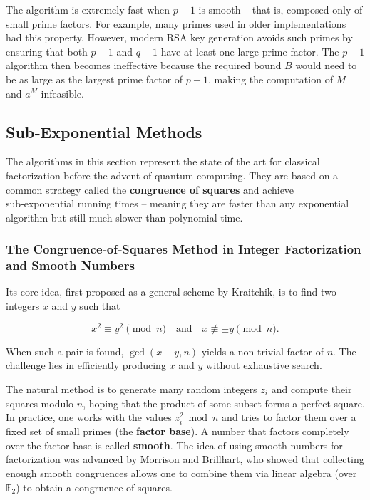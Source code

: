 The algorithm is extremely fast when \(p-1\) is smooth – that is, composed only of small prime factors. For example, many primes used in older implementations had this property. However, modern RSA key generation avoids such primes by ensuring that both \(p-1\) and \(q-1\) have at least one large prime factor. The \(p-1\) algorithm then becomes ineffective because the required bound \(B\) would need to be as large as the largest prime factor of \(p-1\), making the computation of \(M\) and \(a^M\) infeasible.

\subsection{Sub‑Exponential  Methods}

The algorithms in this section represent the state of the art for classical factorization before the advent of quantum computing. They are based on a common strategy called the \textbf{congruence of squares} and achieve sub‑exponential running times – meaning they are faster than any exponential algorithm but still much slower than polynomial time.

\subsubsection*{The Congruence‑of‑Squares Method in Integer Factorization and Smooth Numbers}

Its core idea, first proposed as a general scheme by Kraitchik, is to find two integers \(x\) and \(y\) such that

\[
x^2 \equiv y^2 \pmod{n} \quad \text{and} \quad x \not\equiv \pm y \pmod{n}.
\]

When such a pair is found, \(\gcd(x-y, n)\) yields a non‑trivial factor of \(n\). The challenge lies in efficiently producing \(x\) and \(y\) without exhaustive search.

The natural method is to generate many random integers \(z_i\) and compute their squares modulo \(n\), hoping that the product of some subset forms a perfect square. In practice, one works with the values \(z_i^2 \bmod n\) and tries to factor them over a fixed set of small primes (the \textbf{factor base}). A number that factors completely over the factor base is called \textbf{smooth}. The idea of using smooth numbers for factorization was advanced by Morrison and Brillhart, who showed that collecting enough smooth congruences allows one to combine them via linear algebra (over \(\mathbb{F}_2\)) to obtain a congruence of squares.


